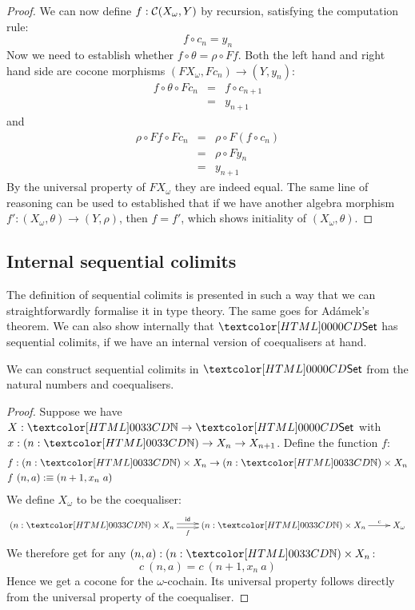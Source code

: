 \begin{proof}
  We can now define $f : \mathcal{C}(X_\omega, Y)$ by recursion, satisfying
  the computation rule:
  $$
  f \circ c_n = y_n
  $$
  Now we need to establish whether $f \circ \theta = \rho \circ F
  f$.
  Both the left hand and right hand side are cocone morphisms
  $(F X_\omega , F c_n) \to (Y , y_n)$:
  \begin{align*}
    f \circ \theta \circ F c_n &=& f \circ c_{n+1} \\
    &=&y_{n+1}
  \end{align*}
  and
  \begin{align*}
    \rho \circ F f \circ F c_n &=& \rho \circ F (f \circ c_n) \\
    &=&\rho \circ F y_n \\
    &=&y_{n+1}
  \end{align*}
  By the universal property of $F X_\omega$ they are indeed equal. The
  same line of reasoning can be used to established that if we have
  another algebra morphism $f' : (X_\omega,\theta) \to (Y,\rho)$, then
  $f = f'$, which shows initiality of $(X_\omega,\theta)$.
\end{proof}

\subsection{Internal sequential colimits}

The definition of sequential colimits is presented in such a way that
we can straightforwardly formalise it in type theory. The same goes
for Ad\'amek's theorem. We can also show internally that $\Set$ has
sequential colimits, if we have an internal version of coequalisers at
hand.

\begin{proposition}
  We can construct sequential colimits in $\Set$ from the natural
  numbers and coequalisers.
\end{proposition}

\begin{proof}
  Suppose we have $X : \natty \to \Set$ with
  $x : (n : \natty) \to X_n \to X_{n+1}$. Define the function $f$:
  \begin{align*}
    &f : (n : \natty) \times X_n \to (n : \natty) \times X_n \\
    &f\ (n , a) \ddefeq (n + 1 , x_n\ a)
  \end{align*}
  We define $X_\omega$ to be the coequaliser:
  $$
  \xymatrix{
    (n : \natty) \times X_n
    \ar@<.5ex>[r]^{\id}
    \ar@<-.5ex>[r]_{f}
    &(n : \natty) \times X_n
    \ar[r]^-{c}
    &X_\omega
  }
  $$
  We therefore get for any $(n , a) : (n : \natty) \times X_n$:
  $$
  c\ (n , a) = c\ (n + 1 , x_n\ a)
  $$
  Hence we get a cocone for the $\omega$-cochain. Its universal
  property follows directly from the universal property of the
  coequaliser.
\end{proof}

